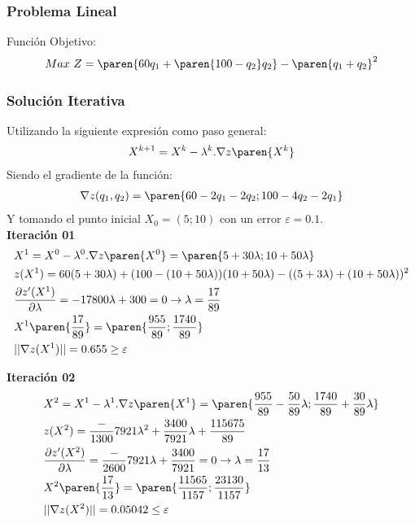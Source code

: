 \begin{homeworkProblem}

\subsubsection{Problema Lineal}
Función Objetivo:
\begin{align*}
    Max\ Z = \paren{60q_1+\paren{100-q_2}q_2} - \paren{q_1+q_2}^2
\end{align*}
\subsubsection{Solución Iterativa}

Utilizando la siguiente expresión como paso general:
\begin{align*}
    X^{k+1}=X^k-\lambda^k.\nabla z\paren{X^k}
\end{align*} 
Siendo el gradiente de la función:
\begin{align*}
    \nabla z(q_1,q_2)=\paren{60-2q_1-2q_2;100-4q_2-2q_1}
\end{align*}
Y tomando el punto inicial $X_0=(5;10)$ con un error $\varepsilon=0.1$.\\

\textbf{Iteración 01}\\
\begin{align*}
    &X^{1}=X^0-\lambda^0.\nabla z\paren{X^0}=\paren{5+30\lambda;10+50\lambda}\\
    &z(X^1)=60(5+30\lambda)+(100-(10+50\lambda))(10+50\lambda)-((5+3\lambda)+(10+50\lambda))^2 \\
    &\frac{\partial z'(X^1) }{\partial \lambda}=
        -17800\lambda +300 = 0 
        \rightarrow \lambda = \frac{17}{89}\\
    &X^1\paren{\frac{17}{89}}=\paren{\frac{955}{89};\frac{1740}{89}}\\
    &||\nabla z(X^1)|| = 0.655 \geq \varepsilon
\end{align*}

\textbf{Iteración 02}\\
\begin{align*}
    &X^{2}=X^1-\lambda^1.\nabla z\paren{X^1}=\paren{\frac{955}{89}-\frac{50}{89}\lambda;\frac{1740}{89}+\frac{30}{89}\lambda}\\
    &z(X^2)=\frac-{1300}{7921}\lambda^2+\frac{3400}{7921}\lambda+\frac{115675}{89} \\
    &\frac{\partial z'(X^2) }{\partial \lambda}=
        \frac-{2600}{7921}\lambda+\frac{3400}{7921}= 0 
        \rightarrow \lambda = \frac{17}{13}\\
    &X^2\paren{\frac{17}{13}}=\paren{\frac{11565}{1157};\frac{23130}{1157}}\\
    &||\nabla z(X^2)|| = 0.05042 \leq \varepsilon
\end{align*}


\end{homeworkProblem}
